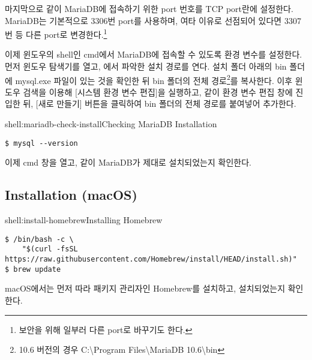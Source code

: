 마지막으로 \와 같이 MariaDB에 접속하기 위한 port 번호를 TCP port란에 설정한다. MariaDB는 기본적으로 3306번 port를 사용하며, 여타 이유로 선점되어 있다면 3307번 등 다른 port로 변경한다.\footnote{보안을 위해 일부러 다른 port로 바꾸기도 한다.}


이제 윈도우의 shell인 cmd에서 MariaDB에 접속할 수 있도록 환경 변수를 설정한다. 먼저 윈도우 탐색기를 열고, 에서 파악한 설치 경로를 연다. 설치 폴더 아래의 bin 폴더에 mysql.exe 파일이 있는 것을 확인한 뒤 bin 폴더의 전체 경로\footnote{10.6 버전의 경우 C:\textbackslash{}Program Files\textbackslash{}MariaDB 10.6\textbackslash{}bin}를 복사한다. 이후 윈도우 검색을 이용해 [시스템 환경 변수 편집]을 실행하고, \과 같이 환경 변수 편집 창에 진입한 뒤, [새로 만들기] 버튼을 클릭하여 bin 폴더의 전체 경로를 붙여넣어 추가한다.

\begin{shell}{shell:mariadb-check-install}{Checking MariaDB Installation}
\begin{verbatim}
$ mysql --version
\end{verbatim}
\end{shell}

이제 cmd 창을 열고, \와 같이 MariaDB가 제대로 설치되었는지 확인한다.

\subsection*{Installation (macOS)}

\begin{shell}{shell:install-homebrew}{Installing Homebrew}
\begin{verbatim}
$ /bin/bash -c \
    "$(curl -fsSL https://raw.githubusercontent.com/Homebrew/install/HEAD/install.sh)"
$ brew update
\end{verbatim}
\end{shell}

macOS에서는 먼저 \를 따라 패키지 관리자인 Homebrew를 설치하고, 설치되었는지 확인한다.

